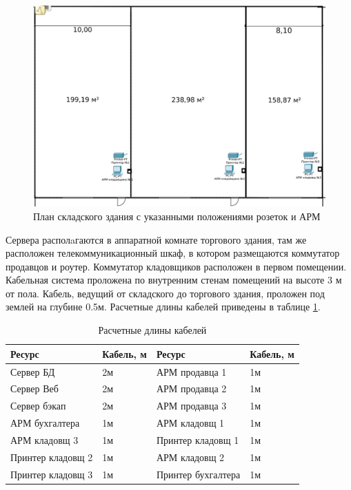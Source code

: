 \begin{figure}[H]
  \centering
  \includegraphics[width=\linewidth]{sec3/img/store.png}
  \caption{План складского здания с указанными положениями розеток и АРМ}
  \label{fig:store-arm}
\end{figure}

Сервера располaгаются в аппаратной комнате торгового здания, там же расположен телекоммуникационный шкаф, в котором размещаются коммутатор продавцов и роутер. Коммутатор кладовщиков расположен в первом помещении. Кабельная система проложена по внутренним стенам помещений на высоте 3 м от пола. Кабель, ведущий от складского до торгового здания, проложен под землей на глубине 0.5м. Расчетные длины кабелей приведены в таблице \ref{tab:cablen}.

\begin{table}[H]
  \centering
  \caption{Расчетные длины кабелей}
  \begin{tabular}{|l|l||l|l|} \hline
    Ресурс & Кабель, м & Ресурс & Кабель, м \\ \hline
    Сервер БД & 2м & АРМ продавца 1 & 1м\\ \hline
    Сервер Веб & 2м & АРМ продавца 2 & 1м \\ \hline
    Сервер бэкап & 2м & АРМ продавца 3 & 1м \\ \hline
    АРМ бухгалтера & 1м & АРМ кладовщ 1 & 1м \\ \hline
    АРМ кладовщ 3 & 1м & Принтер кладовщ 1 & 1м \\ \hline
    Принтер кладовщ 2 & 1м &АРМ кладовщ 2 & 1м \\ \hline
    Принтер кладовщ 3 & 1м& Принтер бухгалтера & 1м \\ \hline
  \end{tabular}
  \label{tab:cablen}
\end{table}

